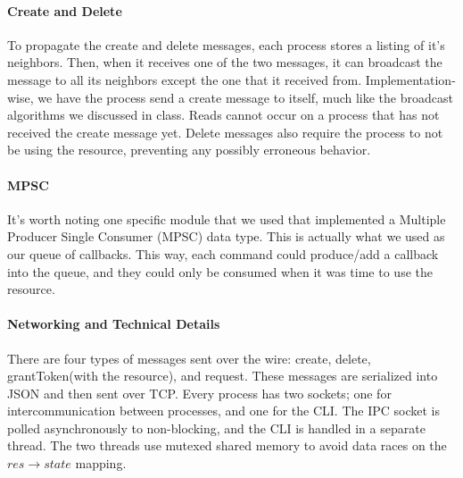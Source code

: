 \documentclass{article}
\begin{document}
\paragraph*{Create and Delete}
To propagate the create and delete messages, each process stores a listing of it's neighbors. Then, when it receives one of the two messages, it can broadcast the message to all its neighbors except the one that it received from. Implementation-wise, we have the process send a create message to itself, much like the broadcast algorithms we discussed in class. Reads cannot occur on a process that has not received the create message yet. Delete messages also require the process to not be using the resource, preventing any possibly erroneous behavior.

\paragraph*{MPSC}
It's worth noting one specific module that we used that implemented a Multiple Producer Single Consumer (MPSC) data type. This is actually what we used as our queue of callbacks. This way, each command could produce/add a callback into the queue, and they could only be consumed when it was time to use the resource.

\paragraph*{Networking and Technical Details}
There are four types of messages sent over the wire: create, delete, grantToken(with the resource), and request. These messages are serialized into JSON and then sent over TCP. Every process has two sockets; one for intercommunication between processes, and one for the CLI. 
The IPC socket is polled asynchronously to non-blocking, and the CLI is handled in a separate thread. The two threads use mutexed shared memory to avoid data races on the $res \to state$ mapping.
\end{document}
